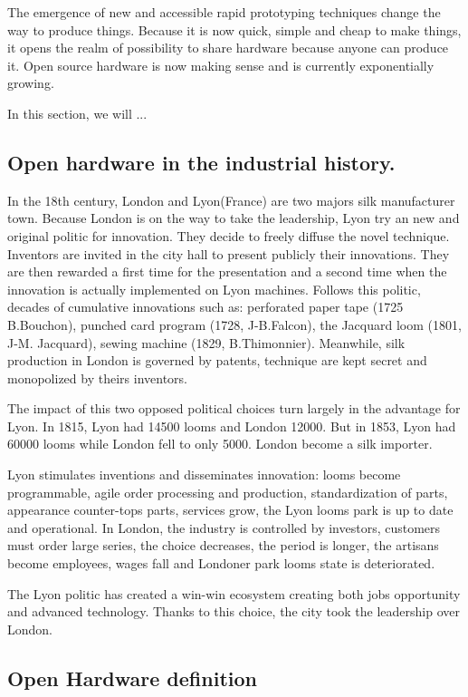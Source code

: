 The emergence of new and accessible rapid prototyping techniques change the way to produce things. Because it is now quick, simple and cheap to make things, it opens the realm of possibility to share hardware because anyone can produce it. Open source hardware is now making sense and is currently exponentially growing.

In this section, we will ...

\subsection{Open hardware in the industrial history.} %

In the 18th century, London and Lyon(France) are two majors silk manufacturer town. Because London is on the way to take the leadership, Lyon try an new and original politic for innovation. They decide to freely diffuse the novel technique. Inventors are invited in the city hall to present publicly their innovations. They are then rewarded a first time for the presentation and a second time when the innovation is actually implemented on Lyon machines. Follows this politic, decades of cumulative innovations such as: perforated paper tape (1725 B.Bouchon), punched card program (1728, J-B.Falcon), the Jacquard loom (1801, J-M. Jacquard), sewing machine (1829, B.Thimonnier). Meanwhile, silk production in London is governed by patents, technique are kept secret and monopolized by theirs inventors. \cite{alain1997fate}

The impact of this two opposed political choices turn largely in the advantage for Lyon. In 1815, Lyon had 14500 looms and London 12000. But in 1853, Lyon had 60000 looms while London fell to only 5000. London become a silk importer.

Lyon stimulates inventions and disseminates innovation: looms become programmable, agile order processing and production, standardization of parts, appearance counter-tops parts, services grow, the Lyon looms park is up to date and operational.
In London, the industry is controlled by investors, customers must order large series, the choice decreases, the period is longer, the artisans become employees, wages fall and Londoner park looms state is deteriorated.

The Lyon politic has created a win-win ecosystem creating both jobs opportunity and advanced technology. Thanks to this choice, the city took the leadership over London.

\subsection{Open Hardware definition} %

